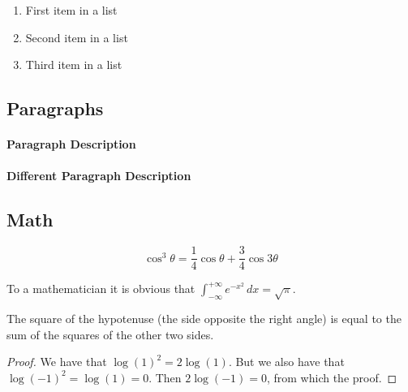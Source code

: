 \documentclass[
12pt, %
a4paper, %
oneside, %
headinclude,footinclude, %
BCOR5mm, %
]{scrartcl}
\begin{document}
\begin{enumerate}[noitemsep] %
\item First item in a list
\item Second item in a list
\item Third item in a list
\end{enumerate}


\subsection{Paragraphs}

\lipsum[6] %

\paragraph{Paragraph Description} \lipsum[7] %

\paragraph{Different Paragraph Description} \lipsum[8] %


\subsection{Math}

\lipsum[4] %

\begin{equation}
\cos^3 \theta =\frac{1}{4}\cos\theta+\frac{3}{4}\cos 3\theta
\label{eq:refname2}
\end{equation}

\lipsum[5] %

\begin{definition}[Gauss] 
To a mathematician it is obvious that
$\int_{-\infty}^{+\infty}
e^{-x^2}\,dx=\sqrt{\pi}$. 
\end{definition} 

\begin{theorem}[Pythagoras]
The square of the hypotenuse (the side opposite the right angle) is equal to the sum of the squares of the other two sides.
\end{theorem}

\begin{proof} 
We have that $\log(1)^2 = 2\log(1)$.
But we also have that $\log(-1)^2=\log(1)=0$.
Then $2\log(-1)=0$, from which the proof.
\end{proof}
\end{document}
